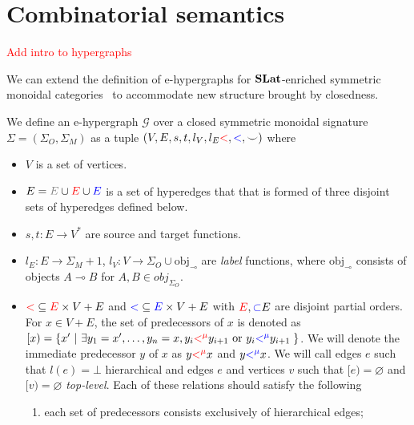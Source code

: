 \section{Combinatorial semantics}

\textcolor{red}{Add intro to hypergraphs}

We can extend the definition of e-hypergraphs for $\mathbf{SLat}$-enriched symmetric monoidal categories~\cite{ghica2024equivalencehypergraphsegraphsmonoidal} to accommodate new structure brought by closedness.


\begin{definition}
We define an e-hypergraph $\mathcal{G}$ over a closed symmetric monoidal signature $\Sigma = (\Sigma_{O}, \Sigma_{M})$ as a tuple $(V,E,s,t, l_{V}, l_{E} \textcolor{red}{<}, \textcolor{blue}{<},{\smile})$ where
\begin{itemize}
  \item $V$ is a set of vertices.
  \item $E = \textcolor{gray}{E} \cup \textcolor{red}{E} \cup \textcolor{blue}{E}$ is a set of hyperedges that that is formed of three disjoint sets of hyperedges defined below.
  \item $s,t : E \to V^{*}$ are source and target functions.
  \item $l_{E} : E \to \Sigma_{M} + 1$, $l_{V} : V \to \Sigma_{O} \cup \text{obj}_{\multimap}$ are \textit{label} functions, where $\text{obj}_{\multimap}$ consists of objects $A \multimap B$ for $A,B \in obj_{\Sigma_{O}}$.
  \item $\textcolor{red}{<} \subseteq \textcolor{red}{E} \times V + E$ and $\textcolor{blue}{<} \subseteq \textcolor{blue}{E} \times V + E $ with $\textcolor{red}{E}, \textcolor{blue} \subset E$ are disjoint partial orders.
        For $x \in V + E$, the set of predecessors of $x$ is denoted as $[x) = \{x' ~|~ \exists y_{1} = x', \ldots, y_{n} = x,  y_{i} \textcolor{red}{<^{\mu}} y_{i + 1} \text{ or } y_{i} \textcolor{blue}{<^{\mu}} y_{i+1}\; \}$.
        We will denote the immediate predecessor $y$ of $x$ as $y \textcolor{red}{<^{\mu}} x$ and $y \textcolor{blue}{<^{\mu}} x$.
        We will call edges $e$ such that $l(e) = \bot$ hierarchical and edges $e$ and vertices $v$ such that $[e) = \varnothing$ and $[v) = \varnothing$ \textit{top-level}.
        Each of these relations should satisfy the following
        \begin{enumerate}
          \item each set of predecessors consists exclusively of hierarchical edges;

\end{enumerate}
\end{itemize}
\end{definition}
